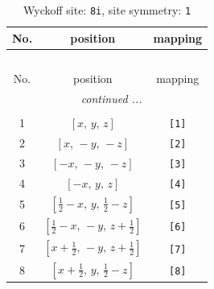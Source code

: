 \documentclass[fleqn,8pt]{jsarticle}
\begin{document}
\renewcommand{\arraystretch}{1.2}
\begin{longtable}{ccc}
\caption{Wyckoff site: {\tt 8i}, site symmetry: {\tt 1}}
 \\
 \hline \hline
No. & position & mapping \\ \hline \endfirsthead

\multicolumn{2}{l}{\tablename\ \thetable{}} \\
 \hline \hline
No. & position & mapping \\ \hline \endhead

 \hline \hline
\multicolumn{2}{r}{\footnotesize\it continued ...} \\ \endfoot

 \hline \hline
\multicolumn{2}{r}{} \\ \endlastfoot

1 & $\left[ x,\, y,\, z \right]$ & {\tt [1]} \\ \hline
2 & $\left[ x,\, - y,\, - z \right]$ & {\tt [2]} \\ \hline
3 & $\left[ - x,\, - y,\, - z \right]$ & {\tt [3]} \\ \hline
4 & $\left[ - x,\, y,\, z \right]$ & {\tt [4]} \\ \hline
5 & $\left[ \frac{1}{2} - x,\, y,\, \frac{1}{2} - z \right]$ & {\tt [5]} \\ \hline
6 & $\left[ \frac{1}{2} - x,\, - y,\, z + \frac{1}{2} \right]$ & {\tt [6]} \\ \hline
7 & $\left[ x + \frac{1}{2},\, - y,\, z + \frac{1}{2} \right]$ & {\tt [7]} \\ \hline
8 & $\left[ x + \frac{1}{2},\, y,\, \frac{1}{2} - z \right]$ & {\tt [8]} \\
\end{longtable}
\end{document}
